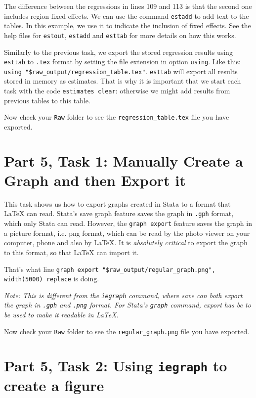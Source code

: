 \documentclass[]{article}
\begin{document}
The difference between the regressions in lines 109 and 113 is that the second one includes region fixed effects. We can use the command \texttt{estadd} to add text to the tables. In this example, we use it to indicate the inclusion of fixed effects. See the help files for \texttt{estout}, \texttt{estadd} and \texttt{esttab} for more details on how this works. 

Similarly to the previous task, we export the stored regression results using \texttt{esttab} to \texttt{.tex} format by setting the file extension in option \texttt{using}. Like this: \verb|using "$raw_output/regression_table.tex"|. \texttt{esttab} will export all results stored in memory as estimates. That is why it is important that we start each task with the code \texttt{estimates 	clear}: otherwise we might add results from previous tables to this table.

Now check your \texttt{Raw} folder to see the \texttt{regression\_table.tex} file you have exported.

\section*{Part 5, Task 1: Manually Create a Graph and then Export it}

This task shows us how to export graphs created in Stata to a format that {\LaTeX} can read. Stata's save graph feature saves the graph in \texttt{.gph} format, which only Stata can read. However, the \texttt{graph export} feature  saves the graph in a picture format, i.e. png format, which can be read by the photo viewer on your computer, phone and also by {\LaTeX}. It is \emph{absolutely critical} to export the graph to this format, so that {\LaTeX} can import it. 

That's what line \verb|graph export "$raw_output/regular_graph.png", width(5000) replace| is doing.

\textit{Note: This is different from the \texttt{iegraph} command, where save can both export the graph in \texttt{.gph} and \texttt{.png} format. For Stata's \texttt{graph} command, export has be to be used to make it readable in {\LaTeX}}. 

Now check your \texttt{Raw} folder to see the \texttt{regular\_graph.png} file you have exported.

\section*{Part 5, Task 2: Using \texttt{iegraph} to create a figure}
\end{document}
